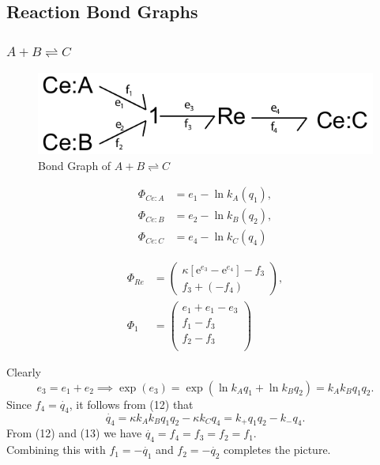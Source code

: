 \documentclass[10pt,reqno]{beamer}
\newcommand{\e}{\mathrm{e}}
\begin{document}
\subsection{Reaction Bond Graphs}
\begin{frame}

\frametitle{$A+B\rightleftharpoons C$}
{\scriptsize
	\begin{figure}
		\includegraphics[scale=0.5]{images/bondgraph_abc_naive}
		\caption{Bond Graph of $A+B \rightleftharpoons C$}
	\end{figure}
	\begin{minipage}{0.475\textwidth}
		\begin{align}
		\Phi_{Ce:A} &= e_1 - \ln k_A(q_1),\\
		\Phi_{Ce:B} &= e_2 - \ln k_B(q_2),\\
		\Phi_{Ce:C} &= e_4 - \ln k_C(q_4)
		\end{align}
	\end{minipage}
	\begin{minipage}{0.475\textwidth}
		\begin{align}\Phi_{Re} &= \left(
		\begin{matrix}
		\kappa\left[\e^{e_3} - \e^{e_4}\right] - f_3\\
		f_3 + (- f_4)
		\end{matrix}
		\right),\\
		\Phi_{1} &= \left(\begin{matrix}
		e_1 +e_1 - e_3 \\
		f_1 - f_3\\
		f_2 - f_3\\
		\end{matrix}\right)
		\end{align}
	\end{minipage}
	
	\vfill
	Clearly
	\[
	e_3 = e_1 + e_2 \implies \exp(e_3) = \exp(\ln k_A q_1 + \ln k_Bq_2) = k_Ak_B q_1q_2.
	\]
	Since $f_4 = \dot{q_4}$,  it follows from (12) that
	\[
	\dot{q_4} =  \kappa k_Ak_B q_1q_2 - \kappa k_C q_4 = k_+q_1q_2 - k_-q_4.
	\]
	From (12) and (13) we have $\dot{q_4} = f_4 =f_3= f_2 = f_1$.\\
	Combining this with $f_1 = -\dot{q_1} $ and $f_2 = -\dot{q_2}$ completes the picture.
}
\end{frame}
\end{document}

